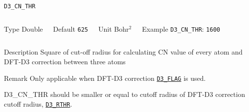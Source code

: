 \begin{frame}[allowframebreaks]{\texttt{D3\_CN\_THR}} \label{D3_CN_THR}
\vspace*{-12pt}
\begin{columns}
\begin{block}{Type}
Double
\end{block}

\begin{block}{Default}
\texttt{625}
\end{block}

\begin{block}{Unit}
Bohr$^2$
\end{block}

\begin{block}{Example}
\texttt{D3\_CN\_THR}: \texttt{1600}
\end{block}
\end{columns}

\begin{block}{Description}
Square of cut-off radius for calculating CN value of every atom and DFT-D3 correction between three atoms
\end{block}

\begin{block}{Remark}
Only applicable when DFT-D3 correction \hyperlink{D3_FLAG}{\texttt{D3\_FLAG}} is used.

D3\_CN\_THR should be smaller or equal to cutoff radius of DFT-D3 correction cutoff radius, \hyperlink{D3_RTHR}{\texttt{D3\_RTHR}}.
\end{block}

\end{frame}


